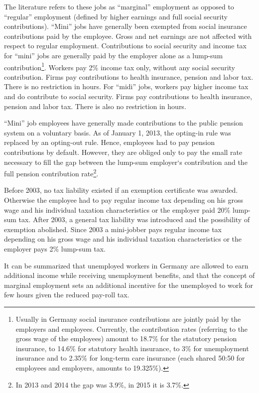 \documentclass[12pt, a4paper]{article}
\begin{document}
The literature refers to these jobs as “marginal” employment as opposed to “regular” employment (defined by higher earnings and full social security contributions). “Mini” jobs have generally been exempted from social insurance contributions paid by the employee. Gross and net earnings are not affected with respect to regular employment. Contributions to social security and income tax for “mini” jobs are generally paid by the employer alone as a lump-sum contribution\footnote{Usually in Germany social insurance contributions are jointly paid by the employers and employees. Currently, the contribution rates (referring to the gross wage of the employees) amount to 18.7\% for the statutory pension insurance, to 14.6\% for statutory health insurance, to 3\% for unemployment insurance and to 2.35\% for long-term care insurance (each shared 50:50 for employees and employers, amounts to 19.325\%).}. Workers pay 2\% income tax only, without any social security contribution. Firms pay contributions to health insurance, pension and labor tax. There is no restriction in hours. For “midi” jobs, workers pay higher income tax and do contribute to social security. Firms pay contributions to health insurance, pension and labor tax. There is also no restriction in hours.

“Mini” job employees have generally made contributions to the public pension system on a  voluntary basis. As of January 1, 2013, the opting-in rule was replaced by an opting-out rule. Hence, employees had to pay pension contributions by default. However, they are obliged only to pay the small rate necessary to fill the gap between the lump-sum employer`s contribution and the full pension contribution rate\footnote{In 2013 and 2014 the gap was 3.9\%, in 2015 it is 3.7\%.}.

Before 2003, no tax liability existed if an exemption certificate was awarded. Otherwise the employee had to pay regular income tax depending on his gross wage and his individual taxation characteristics or the employer paid 20\% lump-sum tax. After 2003, a general tax liability was introduced and the possibility of exemption
abolished. Since 2003 a mini-jobber pays regular income tax depending on his gross wage and his individual taxation characteristics or the employer pays 2\% lump-sum tax.

It can be summarized that unemployed workers in Germany are allowed to earn additional income while receiving unemployment benefits, and that the concept of marginal employment sets an additional incentive for the unemployed to work for few hours given the reduced pay-roll tax.
\end{document}
